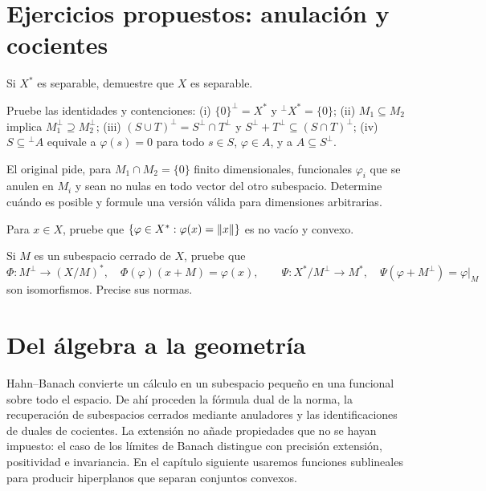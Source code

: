 \section{Ejercicios propuestos: anulación y cocientes}
\begin{ejercicio}\label{ej:v3-l02-1}
Si $X^*$ es separable, demuestre que $X$ es separable.
\end{ejercicio}

\begin{ejercicio}\label{ej:v3-l02-2}
Pruebe las identidades y contenciones: (i) $\{0\}^\perp=X^*$ y ${}^\perp X^*=\{0\}$; (ii) $M_1\subseteq M_2$ implica $M_1^\perp\supseteq M_2^\perp$; (iii) $(S\cup T)^\perp=S^\perp\cap T^\perp$ y $S^\perp+T^\perp\subseteq(S\cap T)^\perp$; (iv) $S\subseteq{}^\perp A$ equivale a $\varphi(s)=0$ para todo $s\in S$, $\varphi\in A$, y a $A\subseteq S^\perp$.
\end{ejercicio}

\begin{ejercicio}\label{ej:v3-l02-3}
El original pide, para $M_1\cap M_2=\{0\}$ finito dimensionales, funcionales $\varphi_i$ que se anulen en $M_i$ y sean no nulas en todo vector del otro subespacio. Determine cuándo es posible y formule una versión válida para dimensiones arbitrarias.
\end{ejercicio}

\begin{ejercicio}\label{ej:v3-l02-4}
Para $x\in X$, pruebe que $\{\varphi\in X^*: \varphi(x)=\left\lVert x\right\rVert\}$ es no vacío y convexo.
\end{ejercicio}

\begin{ejercicio}\label{ej:v3-l02-5}
Si $M$ es un subespacio cerrado de $X$, pruebe que
\[
 \Phi:M^\perp\to(X/M)^*,\quad\Phi(\varphi)(x+M)=\varphi(x),\qquad
 \Psi:X^*/M^\perp\to M^*,\quad\Psi(\varphi+M^\perp)=\varphi|_M
\]
son isomorfismos. Precise sus normas.
\end{ejercicio}


\section{Del álgebra a la geometría}
Hahn--Banach convierte un cálculo en un subespacio pequeño en una funcional sobre todo el espacio. De ahí proceden la fórmula dual de la norma, la recuperación de subespacios cerrados mediante anuladores y las identificaciones de duales de cocientes. La extensión no añade propiedades que no se hayan impuesto: el caso de los límites de Banach distingue con precisión extensión, positividad e invariancia. En el capítulo siguiente usaremos funciones sublineales para producir hiperplanos que separan conjuntos convexos.
